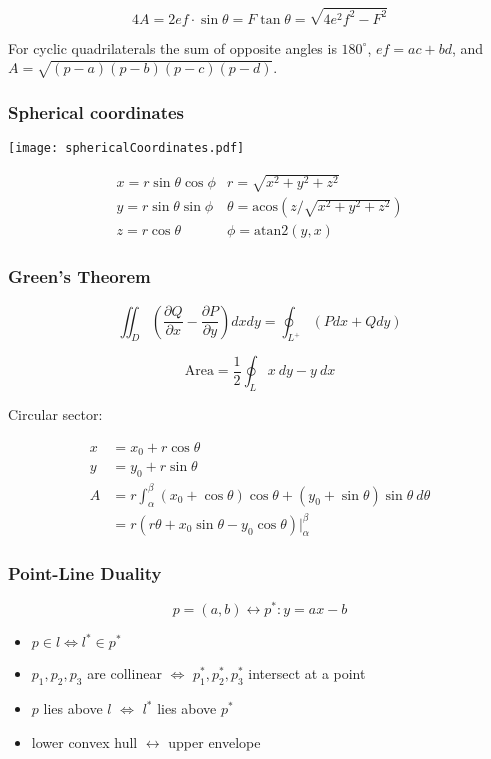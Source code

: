 \[ 4A = 2ef \cdot \sin\theta = F\tan\theta = \sqrt{4e^2f^2-F^2} \]

 For cyclic quadrilaterals the sum of opposite angles is $180^\circ$,
$ef = ac + bd$, and $A = \sqrt{(p-a)(p-b)(p-c)(p-d)}$.

\subsubsection{Spherical coordinates}
\begin{center}
\texttt{[image: sphericalCoordinates.pdf]}
\end{center}
\[\begin{array}{cc}
x = r\sin\theta\cos\phi & r = \sqrt{x^2+y^2+z^2}\\
y = r\sin\theta\sin\phi & \theta = \textrm{acos}(z/\sqrt{x^2+y^2+z^2})\\
z = r\cos\theta & \phi = \textrm{atan2}(y,x)
\end{array}\]

\subsubsection{Green's Theorem}

\[ \iint_D \left( \frac{\partial Q}{\partial x} - \frac{\partial P}{\partial y} \right) dxdy
= \oint_{L^+} (Pdx + Qdy)\]

\[ \text{Area} = \frac{1}{2} \oint_L x\ dy - y\ dx \]

Circular sector:

\begin{align*}
    x &= x_0 + r\cos\theta \\
    y &= y_0 + r\sin\theta \\
    A &= r \int_\alpha^\beta (x_0 + \cos\theta)\cos\theta + (y_0 + \sin\theta)\sin\theta\ d\theta \\
      &= r (r \theta + x_0 \sin\theta - y_0 \cos\theta) \rvert_\alpha^\beta
\end{align*}

\subsubsection{Point-Line Duality}

\[ p=(a,b) \leftrightarrow p^*: y=ax-b \]

\begin{itemize}
    \item $p \in l \iff l^* \in p^*$
    \item $p_1, p_2, p_3$ are collinear $\iff$ $p_1^*, p_2^*, p_3^*$ intersect at a point
    \item $p$ lies above $l$ $\iff$ $l^*$ lies above $p^*$
    \item lower convex hull $\leftrightarrow$ upper envelope
\end{itemize}

